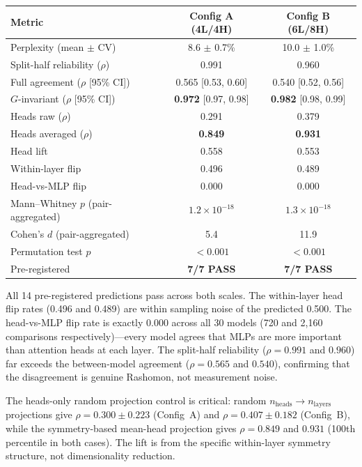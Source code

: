 \documentclass[11pt,a4paper]{article}
\begin{document}
\begin{center}
\small
\begin{tabular}{@{}lcc@{}}
\toprule
Metric & Config A (4L/4H) & Config B (6L/8H) \\
\midrule
Perplexity (mean $\pm$ CV) & 8.6 $\pm$ 0.7\% & 10.0 $\pm$ 1.0\% \\
Split-half reliability ($\rho$) & 0.991 & 0.960 \\
Full agreement ($\rho$ [95\% CI]) & 0.565 [0.53, 0.60] & 0.540 [0.52, 0.56] \\
$G$-invariant ($\rho$ [95\% CI]) & \textbf{0.972} [0.97, 0.98] & \textbf{0.982} [0.98, 0.99] \\
Heads raw ($\rho$) & 0.291 & 0.379 \\
Heads averaged ($\rho$) & \textbf{0.849} & \textbf{0.931} \\
Head lift & 0.558 & 0.553 \\
Within-layer flip & 0.496 & 0.489 \\
Head-vs-MLP flip & 0.000 & 0.000 \\
Mann--Whitney $p$ (pair-aggregated) & $1.2 \times 10^{-18}$ & $1.3 \times 10^{-18}$ \\
Cohen's $d$ (pair-aggregated) & 5.4 & 11.9 \\
Permutation test $p$ & $< 0.001$ & $< 0.001$ \\
Pre-registered & \textbf{7/7 PASS} & \textbf{7/7 PASS} \\
\bottomrule
\end{tabular}
\end{center}

All 14 pre-registered predictions pass across both scales.  The within-layer head flip rates (0.496 and 0.489) are within sampling noise of the predicted 0.500.  The head-vs-MLP flip rate is exactly 0.000 across all 30 models (720 and 2{,}160 comparisons respectively)---every model agrees that MLPs are more important than attention heads at each layer.  The split-half reliability ($\rho = 0.991$ and $0.960$) far exceeds the between-model agreement ($\rho = 0.565$ and $0.540$), confirming that the disagreement is genuine Rashomon, not measurement noise.

The heads-only random projection control is critical: random $n_\mathrm{heads} \to n_\mathrm{layers}$ projections give $\rho = 0.300 \pm 0.223$ (Config~A) and $\rho = 0.407 \pm 0.182$ (Config~B), while the symmetry-based mean-head projection gives $\rho = 0.849$ and $0.931$ (100th percentile in both cases).  The lift is from the specific within-layer symmetry structure, not dimensionality reduction.
\end{document}

